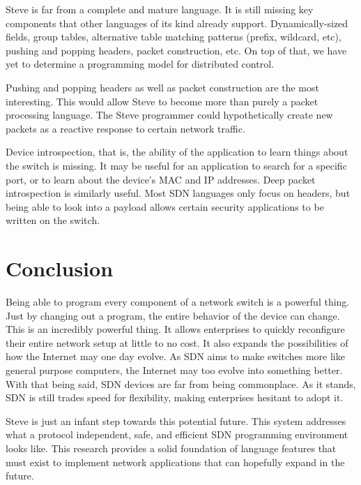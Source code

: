 Steve is far from a complete and mature language. It is still missing key components that other languages of its kind already support. Dynamically-sized fields, group tables, alternative table matching patterns (prefix, wildcard, etc), pushing and popping headers, packet construction, etc. On top of that, we have yet to determine a programming model for distributed control.

Pushing and popping headers as well as packet construction are the most interesting. This would allow Steve to become more than purely a packet processing language. The Steve programmer could hypothetically create new packets as a reactive response to certain network traffic.

Device introspection, that is, the ability of the application to learn things about the switch is missing.
It may be useful for an application to search for a specific port, or to learn about the device's MAC and IP addresses.
Deep packet introspection is similarly useful. Most SDN languages only focus on headers, but being able to look into a payload allows certain security applications to be written on the switch.


\section{Conclusion}

Being able to program every component of a network switch is a powerful thing. Just by changing out a program, the entire behavior of the device can change. This is an incredibly powerful thing. It allows enterprises to quickly reconfigure their entire network setup at little to no cost. It also expands the possibilities of how the Internet may one day evolve. As SDN aims to make switches more like general purpose computers, the Internet may too evolve into something better.
With that being said, SDN devices are far from being commonplace. As it stands, SDN is still trades speed for flexibility, making enterprises hesitant to adopt it. 

Steve is just an infant step towards this potential future. This system addresses what a protocol independent, safe, and efficient SDN programming environment looks like. This research provides a solid foundation of language features that must exist to implement network applications that can hopefully expand in the future.